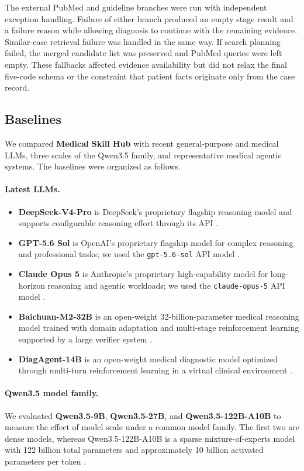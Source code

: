 \documentclass[10pt,letterpaper]{article}
\newcommand{\systemname}{\textbf{Medical Skill Hub}}
\begin{document}
The external PubMed and guideline branches were run with independent exception
handling. Failure of either branch produced an empty stage result and a failure
reason while allowing diagnosis to continue with the remaining evidence.
Similar-case retrieval failure was handled in the same way. If search planning
failed, the merged candidate list was preserved and PubMed queries were left
empty. These fallbacks affected evidence availability but did not relax the final
five-code schema or the constraint that patient facts originate only from the
case record.

\subsection{Baselines}

We compared \systemname{} with recent general-purpose and medical LLMs, three
scales of the Qwen3.5 family, and representative medical agentic systems. The
baselines were organized as follows.

\paragraph{Latest LLMs.}
\begin{itemize}
  \item \textbf{DeepSeek-V4-Pro} is DeepSeek's proprietary flagship reasoning
  model and supports configurable reasoning effort through its API
  \cite{deepseek2026v4pro}.
  \item \textbf{GPT-5.6 Sol} is OpenAI's proprietary flagship model for complex
  reasoning and professional tasks; we used the \texttt{gpt-5.6-sol} API model
  \cite{openai2026gpt56sol}.
  \item \textbf{Claude Opus 5} is Anthropic's proprietary high-capability model
  for long-horizon reasoning and agentic workloads; we used the
  \texttt{claude-opus-5} API model \cite{anthropic2026opus5}.
  \item \textbf{Baichuan-M2-32B} is an open-weight 32-billion-parameter medical
  reasoning model trained with domain adaptation and multi-stage reinforcement
  learning supported by a large verifier system \cite{baichuan2025m2}.
  \item \textbf{DiagAgent-14B} is an open-weight medical diagnostic model
  optimized through multi-turn reinforcement learning in a virtual clinical
  environment \cite{qiu2025diagagent}.
\end{itemize}

\paragraph{Qwen3.5 model family.}
We evaluated \textbf{Qwen3.5-9B}, \textbf{Qwen3.5-27B}, and
\textbf{Qwen3.5-122B-A10B} to measure the effect of model scale under a common
model family. The first two are dense models, whereas Qwen3.5-122B-A10B is a
sparse mixture-of-experts model with 122 billion total parameters and
approximately 10 billion activated parameters per token \cite{qwen2026qwen35}.
\end{document}
